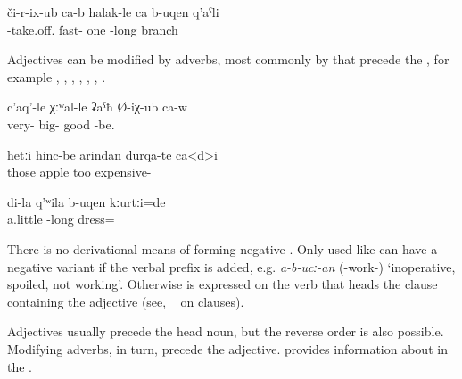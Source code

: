\begin{exe}
	\ex	\label{ex:He immediately broke one long branch (off a tree)}
	\gll	či-r-ix-ub	ca-b	halak-le	ca	b-uqen	q'aˁli \\
		-take.off.		fast-	one	-long	branch \\
	\glt	{}
\end{exe}

Adjectives can be modified by adverbs, most commonly by  that precede the , for example  ,  ,   ,  ,   ,  ,   . 
%
\begin{exe}
	\ex	\label{ex:He was very very good}
	\gll	c'aq'-le	χːʷal-le	ʡaˁħ	Ø-iχ-ub ca-w \\
		very-	big-	good	-be.  \\
	\glt	{}

	\ex	\label{ex:The apples are too expensive}
	\gll	hetːi	hinc-be	arindan	durqa-te	ca<d>i \\
		those	apple	too	expensive- 	\\
	\glt	{}

	\ex	\label{ex:My shirt was a bit long}
	\gll	di-la	q'ʷila	b-uqen	kːurtːi=de \\
			a.little	-long	dress= \\
	\glt	{}
\end{exe}

There is no derivational means of forming negative . Only  used like  can have a negative variant if the verbal  prefix  is added, e.g. \textit{a-b-ucː-an} (-work-) `inoperative, spoiled, not working'. Otherwise  is expressed on the verb that heads the clause containing the adjective (see, \teg\  on  clauses).

Adjectives usually precede the head noun, but the reverse order is also possible. Modifying adverbs, in turn, precede the adjective.  provides information about  in the .


